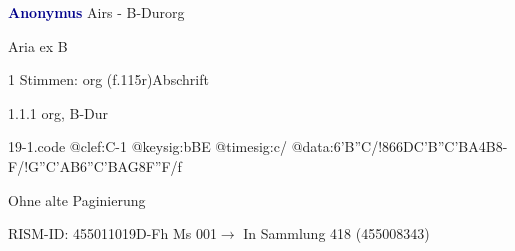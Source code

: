 \documentclass[twocolumn]{book}
\begin{document}
\par \vspace{7pt} \textcolor{darkblue}{\textbf{Anonymus  }}\hfillplus{\textbf{[19]}}\newline Airs - B-Dur\newline org
\par \begin{itshape}[f.115r, heading:] Aria ex B\end{itshape} 
\par \textcolor{darkblue}{}  1 Stimmen: org  (f.115r)\newline Abschrift
\par 1.1.1  org, B-Dur  
\begin{filecontents*}{19-1.code}
@clef:C-1
@keysig:bBE
@timesig:c/
@data:{6'B''C}/!{866DC'B}{''C'BA}4B8-F/!{G''C}{'AB}{6''C'BAG}{8F''F}/f
\end{filecontents*}
\newline
%
\par Ohne alte Paginierung
\par RISM-ID: 455011019\newline D-Fh  Ms 001\newline $\rightarrow$ In Sammlung 418 (455008343)
      
\end{document}
